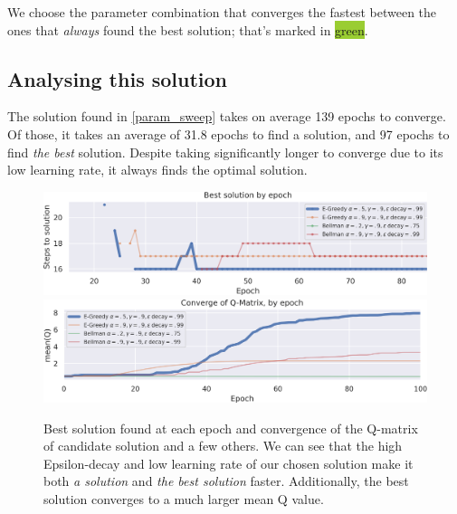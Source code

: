 We choose the parameter combination that converges the fastest between the ones that \emph{always} found the best solution; that's marked in \colorbox{YellowGreen}{green}.

\subsection{Analysing this solution}
The solution found in \cref{param_sweep} takes on average 139 epochs to converge.
Of those, it takes an average of 31.8 epochs to find a solution, and 97 epochs to find \emph{the best} solution.
Despite taking significantly longer to converge due to its low learning rate, it always finds the optimal solution.

\begin{figure}[H]
	\centering
	\includegraphics[width=\textwidth]{task1_best_solution_by_epoch.png} \\[1ex]
	\includegraphics[width=\textwidth]{task1_qmatrix_convergence.png}
	\caption{Best solution found at each epoch and convergence of the Q-matrix of candidate solution and a few others. We can see that the high Epsilon-decay and low learning rate of our chosen solution make it both \emph{a solution} and \emph{the best solution} faster. Additionally, the best solution converges to a much larger mean Q value.}
\end{figure}

\vspace{-13pt}

